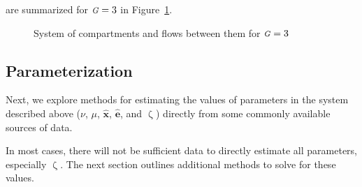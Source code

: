 \documentclass[10pt]{article}
\numberwithin{equation}{section}
\renewcommand{\zeta}{\upzeta}
\newcommand{\G}{{\mbox{\footnotesize{\textit{G}}}}}
\newcommand{\fig}[1]{Figure~\ref{#1}}
\begin{document}
are summarized for $\G = 3$ in \fig{fig:system}.
\begin{figure}[h]
  \centering
  \caption{System of compartments and flows between them for $\G = 3$}
  \label{fig:system}
\end{figure}
\subsection{Parameterization}\label{ss:params}
Next, we explore methods for estimating the values of parameters
in the system described above
($\nu$, $\mu$, $\bm{\hat{x}}$, $\bm{\hat{e}}$, and $\zeta$)
directly from some commonly available sources of data.
\par
In most cases, there will not be sufficient data to directly estimate all parameters,
especially $\zeta$.
The next section outlines additional methods to solve for these values.
\end{document}
